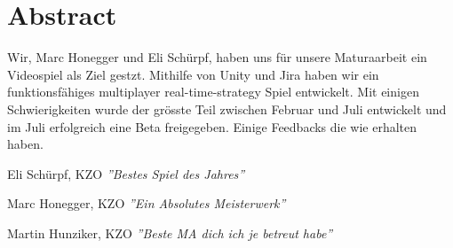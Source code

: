 \chapter*{Abstract}

Wir, Marc Honegger und Eli Schürpf, haben uns für unsere Maturaarbeit ein Videospiel als Ziel gestzt.
Mithilfe von Unity und Jira haben wir ein funktionsfähiges multiplayer real-time-strategy Spiel entwickelt.
Mit einigen Schwierigkeiten wurde der grösste Teil zwischen Februar und Juli entwickelt und im Juli
erfolgreich eine Beta freigegeben. Einige Feedbacks die wie erhalten haben.
\\
\begin{pquotation}{Eli Schürpf, KZO}
    {\huge \textsl {''Bestes Spiel des Jahres''}}
\end{pquotation}
\begin{pquotation}{Marc Honegger, KZO}
    {\huge \textsl {''Ein Absolutes Meisterwerk''}}
\end{pquotation}
\begin{pquotation}{Martin Hunziker, KZO}
    {\huge \textsl {''Beste MA dich ich je betreut habe''}}
\end{pquotation}
